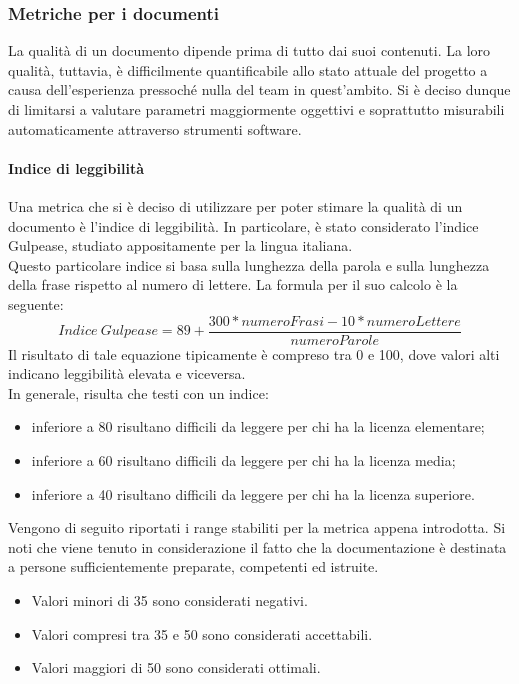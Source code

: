 \documentclass[../PianoDiQualifica.tex]{subfiles}
\begin{document}
			\subsubsection{Metriche per i documenti}
			La qualità di un documento dipende prima di tutto dai suoi contenuti. La loro qualità, tuttavia, è difficilmente quantificabile allo stato attuale del progetto a causa dell'esperienza pressoché nulla del team in quest'ambito. Si è deciso dunque di limitarsi a valutare parametri maggiormente oggettivi e soprattutto misurabili automaticamente attraverso strumenti software.
				\paragraph{Indice di leggibilità}
				Una metrica che si è deciso di utilizzare per poter stimare la qualità di un documento è l'indice di leggibilità. In particolare, è stato considerato l'indice Gulpease, studiato appositamente per la lingua italiana.				\\Questo particolare indice si basa sulla lunghezza della parola e sulla lunghezza della frase rispetto al numero di lettere. La formula per il suo calcolo è la seguente:
				\begin{equation}
					Indice \  Gulpease = 89 + \frac{300*numeroFrasi-10*numeroLettere}{numeroParole}
				\end{equation}
				Il risultato di tale equazione tipicamente è compreso tra 0 e 100, dove valori alti indicano leggibilità elevata e viceversa.\\
				In generale, risulta che testi con un indice:
				\begin{itemize}
					\item inferiore a 80 risultano difficili da leggere per chi ha la licenza elementare;
					\item inferiore a 60 risultano difficili da leggere per chi ha la licenza media;
				\item inferiore a 40 risultano difficili da leggere per chi ha la licenza superiore.
				\end{itemize}
				Vengono di seguito riportati i range stabiliti per la metrica appena introdotta. Si noti che viene tenuto in considerazione il fatto che la documentazione è destinata a persone sufficientemente preparate, competenti ed istruite.
				\begin{itemize}
					\item Valori minori di 35 sono considerati negativi.
					\item Valori compresi tra 35 e 50 sono considerati accettabili.
					\item Valori maggiori di 50 sono considerati ottimali. 
				\end{itemize}
\end{document}
